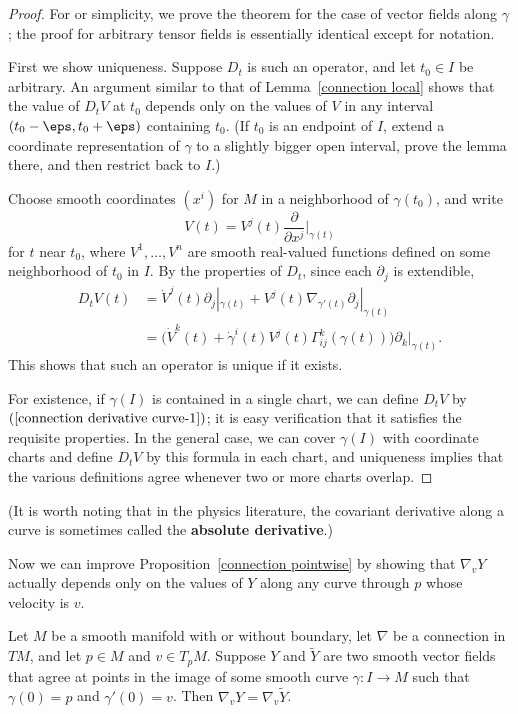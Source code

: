 \begin{proof}
For or simplicity, we prove the theorem for the case of vector fields along $\gamma$; the 
proof for arbitrary tensor fields is essentially identical except for notation.\par
First we show uniqueness. Suppose $D_t$ is such an operator, and let $t_0\in I$ be arbitrary. 
An argument similar to that of Lemma~\ref{connection local} shows that the value 
of $D_tV$ at $t_0$ depends only on the values of $V$ in any interval $(t_0-\eps,t_0+\eps)$ containing 
$t_0$. (If $t_0$ is an endpoint of $I$, extend a coordinate representation of $\gamma$ to a slightly 
bigger open interval, prove the lemma there, and then restrict back to $I$.)\par
Choose smooth coordinates $(x^i)$ for $M$ in a neighborhood of $\gamma(t_0)$, and write
\[V(t)=V^j(t)\frac{\partial}{\partial x^j}\Big|_{\gamma(t)}\]
for $t$ near $t_0$, where $V^1,\dots,V^n$ are smooth real-valued functions defined 
on some neighborhood of $t_0$ in $I$. By the properties of $D_t$, since each $\partial_j$ is 
extendible,
\begin{equation}\label{connection derivative curve-1}
\begin{aligned}
D_tV(t)&=\dot{V}^j(t)\partial_j|_{\gamma(t)}+V^j(t)\nabla_{\gamma'(t)}\partial_j|_{\gamma(t)}\\
&=\big(\dot{V}^k(t)+\dot{\gamma}^i(t)V^j(t)\Gamma_{ij}^{k}(\gamma(t))\big)\partial_k|_{\gamma(t)}.
\end{aligned}
\end{equation}
This shows that such an operator is unique if it exists.\par
For existence, if $\gamma(I)$ is contained in a single chart, we can define $D_tV$ by 
$(\ref{connection derivative curve-1})$; it is easy verification that it 
satisfies the requisite properties. In the general case, we can cover 
$\gamma(I)$ with coordinate charts and define $D_tV$ by this formula in each 
chart, and uniqueness implies that the various definitions agree whenever 
two or more charts overlap.
\end{proof}
(It is worth noting that in the physics literature, the covariant derivative along a curve 
is sometimes called the \textbf{absolute derivative}.)\par
Now we can improve Proposition~\ref{connection pointwise} by showing that $\nabla_vY$ actually 
depends only on the values of $Y$ along any curve through $p$ whose velocity 
is $v$.
\begin{proposition}\label{connection local curve}
Let $M$ be a smooth manifold with or without boundary, let $\nabla$ be a connection 
in $TM$, and let $p\in M$ and $v\in T_pM$. Suppose $Y$ and $\widetilde{Y}$ are 
two smooth vector fields that agree at points in the image of some smooth curve $\gamma:I\to M$ 
such that $\gamma(0)=p$ and $\gamma'(0)=v$. Then $\nabla_vY=\nabla_v\widetilde{Y}$.
\end{proposition}
